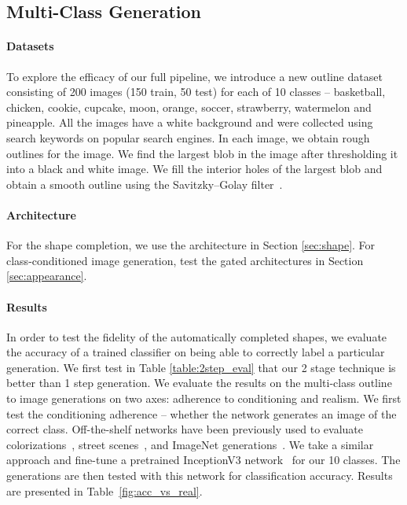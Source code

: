   


\subsection{Multi-Class Generation} 
\paragraph{Datasets} To explore the efficacy of our full pipeline, we introduce a new outline dataset consisting of 200 images (150 train, 50 test) for each of 10 classes -- basketball, chicken, cookie, cupcake, moon, orange, soccer, strawberry,  watermelon and pineapple. All the images have a white background and were collected using search keywords on popular search engines.
In each image, we obtain rough outlines for the image. We find the largest blob in the image after thresholding it into a black and white image. We fill the interior holes of the largest blob and obtain a smooth outline using the Savitzky–Golay filter~\cite{savitzky1964smoothing}.

\paragraph{Architecture} For the shape completion, we use the architecture in Section \ref{sec:shape}. For class-conditioned image generation, test the gated architectures in Section \ref{sec:appearance}.
\vspace{-4mm}
\paragraph{Results}
In order to test the fidelity of the automatically completed shapes, we evaluate the accuracy of a trained classifier on being able to correctly label a particular generation.
We first test in Table \ref{table:2step_eval} that our 2 stage technique is better than 1 step generation.
We evaluate the results on the multi-class outline to image generations on two axes: adherence to conditioning and realism. We first test the conditioning adherence -- whether the network generates an image of the correct class.
Off-the-shelf networks have been previously used to evaluate colorizations~\cite{zhang2016colorful}, street scenes~\cite{isola2016image2image, wang2017high}, and ImageNet generations~\cite{salimans2016improved}. 
We take a similar approach and fine-tune a pretrained InceptionV3 network~\cite{szegedy2016rethinking} for our 10 classes. 
The generations are then tested with this network for classification accuracy. Results are presented in Table~\ref{fig:acc_vs_real}.

